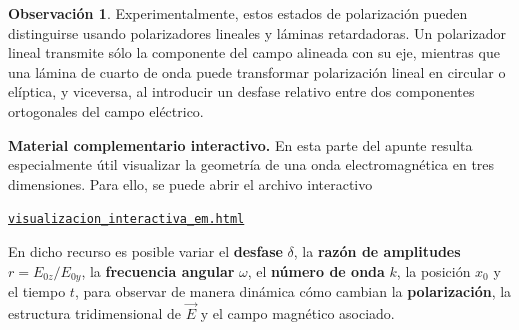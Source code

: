 \documentclass[12pt,a4paper]{article}
\theoremstyle{definition}
\newtheorem{observacion}[definicion]{Observación}
\theoremstyle{plain}
\numberwithin{equation}{section}
\theoremstyle{remark}
\newcommand{\E}{\vec{E}}
\begin{document}
\begin{observacion}
Experimentalmente, estos estados de polarización pueden distinguirse usando polarizadores lineales y láminas retardadoras. Un polarizador lineal transmite sólo la componente del campo alineada con su eje, mientras que una lámina de cuarto de onda puede transformar polarización lineal en circular o elíptica, y viceversa, al introducir un desfase relativo entre dos componentes ortogonales del campo eléctrico.
\end{observacion}

\begin{cajaidea}
\textbf{Material complementario interactivo.} En esta parte del apunte resulta especialmente útil visualizar la geometría de una onda electromagnética en tres dimensiones. Para ello, se puede abrir el archivo interactivo
\begin{center}
    \href{run:./visualizacion_interactiva_em.html}{\texttt{visualizacion\_interactiva\_em.html}}
\end{center}
En dicho recurso es posible variar el \textbf{desfase} $\delta$, la \textbf{razón de amplitudes} $r=E_{0z}/E_{0y}$, la \textbf{frecuencia angular} $\omega$, el \textbf{número de onda} $k$, la posición $x_0$ y el tiempo $t$, para observar de manera dinámica cómo cambian la \textbf{polarización}, la estructura tridimensional de $\E$ y el campo magnético asociado.
\end{cajaidea}


\end{document}
